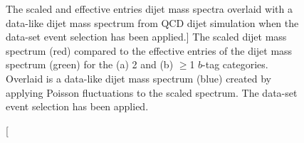 \vspace{-0.5em}
\begin{figure}[!ht]
  \begin{center}
   \captionsetup[subfigure]{aboveskip=0pt,justification=centering}
    \hspace{-0.2cm}
  \end{center}
  \vspace{-1em}
  \caption
      [The scaled and effective entries dijet mass spectra overlaid with a data-like dijet mass spectrum
        from QCD dijet simulation when the \summer{} data-set event selection has been applied.]
      {The scaled dijet mass spectrum (red) compared to the
        effective entries of the dijet mass spectrum (green)
        for the (a) 2 and (b) $\geq$1 $b$-tag categories.
        Overlaid is a data-like dijet mass spectrum (blue) created by applying Poisson fluctuations to the scaled spectrum.
        The \summer{} data-set event selection has been applied.}
  \label{fig:effEntDataLike}
\end{figure}
\vspace{-0.5em}

